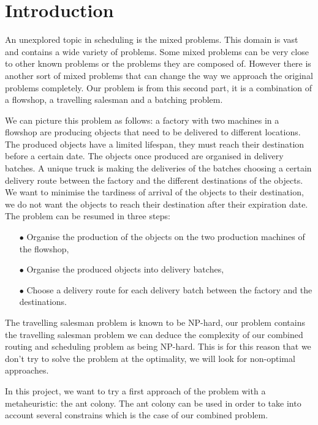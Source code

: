 \documentclass[UTF8, twoside]{EPURapport}
\begin{document}
\chapter{Introduction}

	\hspace{4ex}An unexplored topic in scheduling is the mixed problems. This domain is vast and contains a wide variety of problems. Some mixed problems can be very close to other known problems or the problems they are composed of. However there is another sort of mixed problems that can change the way we approach the original problems completely. Our problem is from this second part, it is a combination of a flowshop, a travelling salesman and a batching problem.
	
	We can picture this problem as follows: a factory with two machines in a flowshop are producing objects that need to be delivered to different locations. The produced objects have a limited lifespan, they must reach their destination before a certain date. The objects once produced are organised in delivery batches. A unique truck is making the deliveries of the batches choosing a certain delivery route between the factory and the different destinations of the objects. We want to minimise the tardiness of arrival of the objects to their destination, we do not want the objects to reach their destination after their expiration date. The problem can be resumed in three steps:
\begin{itemize}
\item[$\bullet$] Organise the production of the objects on the two production machines of the flowshop,
\item[$\bullet$] Organise the produced objects into delivery batches,
\item[$\bullet$] Choose a delivery route for each delivery batch between the factory and the destinations.
\end{itemize}

	The travelling salesman problem is known to be NP-hard, our problem contains the travelling salesman problem we can deduce the complexity of our combined routing and scheduling problem as being NP-hard. This is for this reason that we don't try to solve the problem at the optimality, we will look for non-optimal approaches.

	In this project, we want to try a first approach of the problem with a metaheuristic: the ant colony. The ant colony can be used in order to take into account several constrains which is the case of our combined problem.
	\\
	
\end{document}
